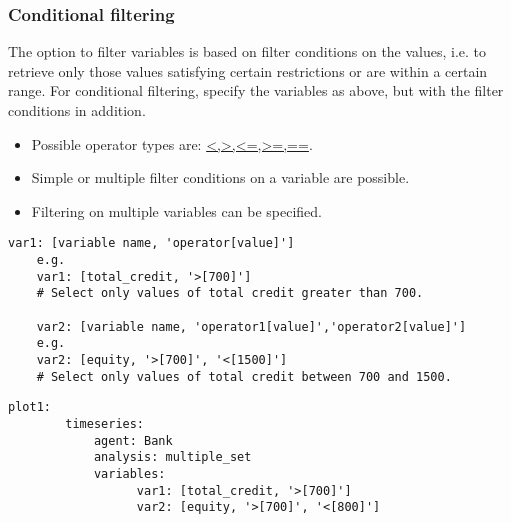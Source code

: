 \documentclass[10pt,a4paper]{article}
\begin{document}
\subsubsection*{Conditional filtering}
The option to filter variables is based on filter conditions on the values, i.e. to retrieve only those values satisfying certain restrictions or are within a certain range. For conditional filtering, specify the variables as above, but with the filter conditions in addition.

\begin{itemize}
    \item Possible operator types are: \url{<,>,<=,>=,==}.
    \item Simple or multiple filter conditions on a variable are possible.
    \item Filtering on multiple variables can be specified.
\end{itemize}
        
\begin{lstlisting}[caption={Filtering examples using single and multiple filter conditions.}]
    var1: [variable name, 'operator[value]']
    e.g.
    var1: [total_credit, '>[700]'] 
    # Select only values of total credit greater than 700.
    
    var2: [variable name, 'operator1[value]','operator2[value]']
    e.g.
    var2: [equity, '>[700]', '<[1500]'] 
    # Select only values of total credit between 700 and 1500.
\end{lstlisting}    

\begin{lstlisting}[caption={Filtering example using multiple variables.}]
    plot1:
        timeseries:
            agent: Bank
            analysis: multiple_set
            variables: 
                  var1: [total_credit, '>[700]']  
                  var2: [equity, '>[700]', '<[800]']
\end{lstlisting}    
\end{document}
